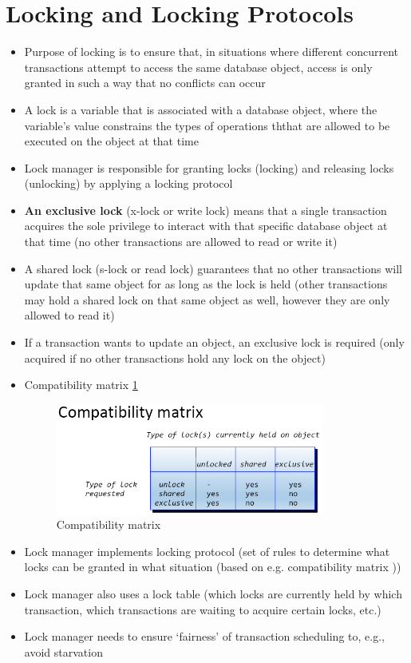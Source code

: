 \documentclass{report}
\begin{document}
\section{Locking and Locking Protocols}
\begin{itemize}
    \item Purpose of locking is to ensure that, in situations where different concurrent transactions attempt to access the  same database object, access is only granted in such a way that no conflicts can occur
    \item A lock is a variable that is associated with a database object, where the variable’s value constrains the types of operations ththat are allowed to be executed on the object at that time
    \item Lock manager is responsible for granting locks (locking) and releasing locks (unlocking) by applying a locking protocol
    \item \textbf{An exclusive lock} (x-lock or write lock) means that a single transaction acquires the sole privilege to interact with that specific database object at that time (no other transactions are allowed to read or write it)
    \item A {shared lock} (s-lock or read lock) guarantees that no other transactions will update that same object for as long as the lock is held (other transactions may hold a shared lock on that same object as well, however they are only allowed to read it)
    \item If a transaction wants to update an object, an exclusive lock is required (only acquired if no other transactions hold any lock on the object)
    \item Compatibility matrix \ref{fig:Compatibility-matrix}
    \begin{figure}
        \includegraphics[width=250pt]{./images/Compatibility-matrix.png}
        \caption{\label{fig:Compatibility-matrix}Compatibility matrix}
    \end{figure}
    \item Lock manager implements locking protocol (set of rules to determine what locks can be granted in what situation (based on e.g. compatibility matrix ))
    \item Lock manager also uses a lock table (which locks are currently held by which transaction, which transactions are waiting to acquire certain locks, etc.)
    \item Lock manager needs to ensure ‘fairness’ of transaction scheduling to, e.g., avoid starvation        
\end{itemize}
\end{document}
